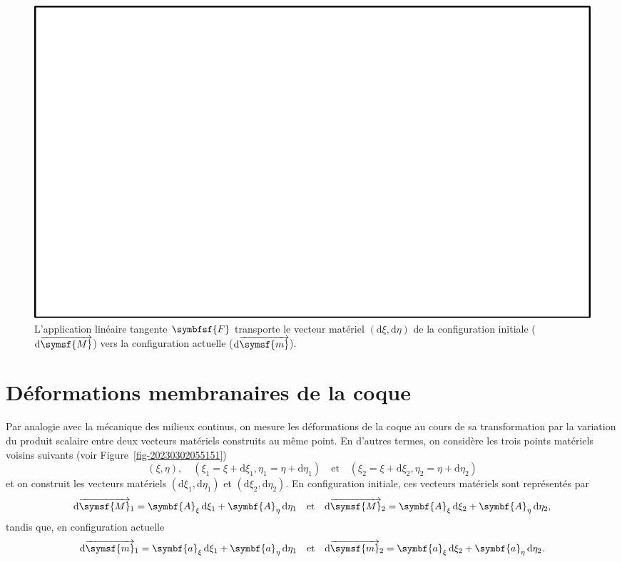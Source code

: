 \documentclass[
  a4paper,
  DIV=11,
  numbers=noendperiod]{scrreprt}
\newcommand{\altvec}[1]{\overrightarrow{#1}}
\newcommand{\D}{{\mathrm d}}
\newcommand{\point}[1]{\symsf{#1}}
\newcommand{\tens}[1]{\symbfsf{#1}}
\renewcommand{\vec}[1]{\symbf{#1}}
\begin{document}
\begin{figure}

{\centering \includegraphics{./croquis/blanc.pdf}

}

\caption{\label{fig-20230302054334}L'application linéaire tangente
\(\tens{F}\) transporte le vecteur matériel \((\D\xi, \D\eta)\) de la
configuration initiale (\(\D\altvec{\point{M}}\)) vers la configuration
actuelle (\(\D\altvec{\point{m}}\)).}

\end{figure}

\hypertarget{duxe9formations-membranaires-de-la-coque}{%
\section{Déformations membranaires de la
coque}\label{duxe9formations-membranaires-de-la-coque}}

Par analogie avec la mécanique des milieux continus, on mesure les
déformations de la coque au cours de sa transformation par la variation
du produit scalaire entre deux vecteurs matériels construits au même
point. En d'autres termes, on considère les trois points matériels
voisins suivants (voir Figure~\ref{fig-20230302055151}) \[
(\xi, \eta), \quad (\xi_1 = \xi + \D \xi_1, \eta_1 = \eta + \D \eta_1)
\quad \text{et} \quad
(\xi_2 = \xi + \D \xi_2, \eta_2 = \eta + \D \eta_2)
\] et on construit les vecteurs matériels \((\D \xi_1, \D \eta_1)\) et
\((\D \xi_2, \D \eta_2)\). En configuration initiale, ces vecteurs
matériels sont représentés par \[
\D\altvec{\point{M}}_1 = \vec{A}_\xi \, \D \xi_1 + \vec{A}_\eta \, \D \eta_1
\quad \text{et} \quad
\D\altvec{\point{M}}_2 = \vec{A}_\xi \, \D \xi_2 + \vec{A}_\eta \, \D \eta_2,
\] tandis que, en configuration actuelle \[
\D\altvec{\point{m}}_1 = \vec{a}_\xi \, \D \xi_1 + \vec{a}_\eta \, \D \eta_1
\quad \text{et} \quad
\D\altvec{\point{m}}_2 = \vec{a}_\xi \, \D \xi_2 + \vec{a}_\eta \, \D \eta_2.
\]
\end{document}
